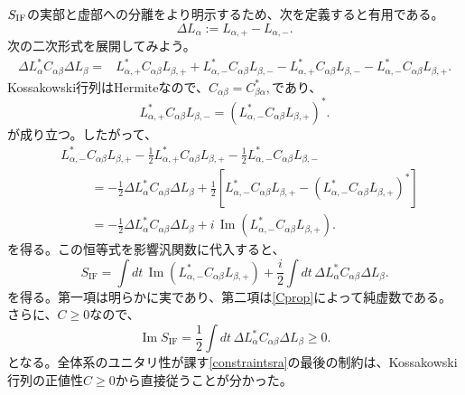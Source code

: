 \documentclass[a4paper,11pt,oneside]{article}
\theoremstyle{definition}
\numberwithin{equation}{section}
\begin{document}
$ S_{\rm IF}$の実部と虚部への分離をより明示するため、次を定義すると有用である。
\begin{equation}
\Delta L_{\alpha}
:=
L_{\alpha,+}
-
L_{\alpha,-}.
\end{equation}
次の二次形式を展開してみよう。
\begin{align}
\Delta L_{\alpha}^{*}
C_{\alpha\beta}
\Delta L_{\beta}
={}&
L_{\alpha,+}^{*}
C_{\alpha\beta}
L_{\beta,+}
+
L_{\alpha,-}^{*}
C_{\alpha\beta}
L_{\beta,-}-
L_{\alpha,+}^{*}
C_{\alpha\beta}
L_{\beta,-}
-
L_{\alpha,-}^{*}
C_{\alpha\beta}
L_{\beta,+}.
\end{align}
Kossakowski行列はHermiteなので、\(
C_{\alpha\beta}
=
C_{\beta\alpha}^{*},
\)であり、
\begin{equation}
L_{\alpha,+}^{*}
C_{\alpha\beta}
L_{\beta,-}
=
\left(
L_{\alpha,-}^{*}
C_{\alpha\beta}
L_{\beta,+}
\right)^{*}.
\end{equation}
が成り立つ。したがって、
\begin{align}
&
L_{\alpha,-}^{*}
C_{\alpha\beta}
L_{\beta,+}
-
\frac{1}{2}
L_{\alpha,+}^{*}
C_{\alpha\beta}
L_{\beta,+}
-
\frac{1}{2}
L_{\alpha,-}^{*}
C_{\alpha\beta}
L_{\beta,-}
\nonumber\\
&\hspace{1cm}
=
-\frac{1}{2}
\Delta L_{\alpha}^{*}
C_{\alpha\beta}
\Delta L_{\beta}
+
\frac{1}{2}
\left[
L_{\alpha,-}^{*}
C_{\alpha\beta}
L_{\beta,+}
-
\left(
L_{\alpha,-}^{*}
C_{\alpha\beta}
L_{\beta,+}
\right)^{*}
\right]
\nonumber\\
&\hspace{1cm}
=
-\frac{1}{2}
\Delta L_{\alpha}^{*}
C_{\alpha\beta}
\Delta L_{\beta}
+
i\,
\operatorname{Im}
\left(
L_{\alpha,-}^{*}
C_{\alpha\beta}
L_{\beta,+}
\right).
\end{align}
を得る。この恒等式を影響汎関数に代入すると、
\begin{equation}
S_{\mathrm{IF}}
=
\int dt\,
\operatorname{Im}
\left(
L_{\alpha,-}^{*}
C_{\alpha\beta}
L_{\beta,+}
\right)
+
\frac{i}{2}
\int dt\,
\Delta L_{\alpha}^{*}
C_{\alpha\beta}
\Delta L_{\beta}.
\end{equation}
を得る。第一項は明らかに実であり、第二項は\eqref{Cprop}によって純虚数である。さらに、$C\geq0$なので、
\begin{equation}
\operatorname{Im}S_{\mathrm{IF}}
=
\frac{1}{2}
\int dt\,
\Delta L_{\alpha}^{*}
C_{\alpha\beta}
\Delta L_{\beta}
\geq0.
\end{equation}
となる。全体系のユニタリ性が課す\eqref{constraintsra}の最後の制約は、Kossakowski行列の正値性$C\geq0$から直接従うことが分かった。
\end{document}
